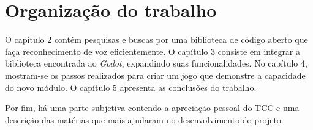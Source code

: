
\section{Organização do trabalho}

O capítulo 2 contém pesquisas e buscas por uma biblioteca de código aberto que faça
reconhecimento de voz eficientemente. O capítulo 3 consiste em integrar a biblioteca
encontrada ao \emph{Godot}, expandindo suas funcionalidades. No capítulo 4,
mostram-se os passos realizados para criar um jogo que demonstre a capacidade do
novo módulo. O capítulo 5 apresenta as conclusões do trabalho.

Por fim, há uma parte subjetiva contendo a apreciação pessoal do TCC e uma descrição
das matérias que mais ajudaram no desenvolvimento do projeto.
